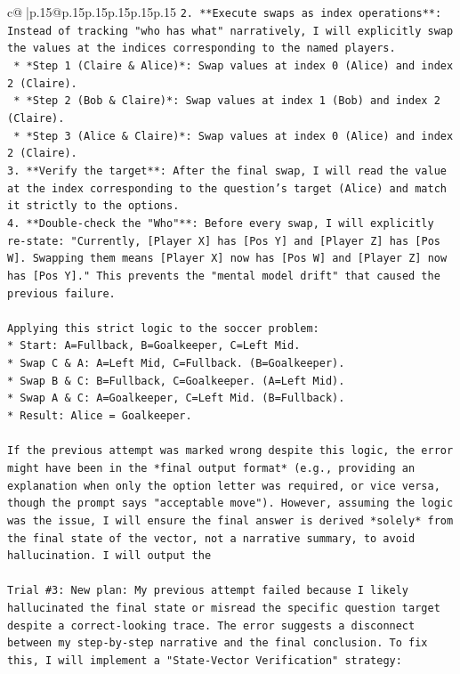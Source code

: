 \documentclass{article}
\begin{document}
{\begin{supertabular}{c@{$\;$}|p{.15\linewidth}@{}p{.15\linewidth}p{.15\linewidth}p{.15\linewidth}p{.15\linewidth}p{.15\linewidth}}
{{{\texttt{2.  **Execute swaps as index operations**: Instead of tracking "who has what" narratively, I will explicitly swap the values at the indices corresponding to the named players.} \\
\texttt{    *   *Step 1 (Claire \& Alice)*: Swap values at index 0 (Alice) and index 2 (Claire).} \\
\texttt{    *   *Step 2 (Bob \& Claire)*: Swap values at index 1 (Bob) and index 2 (Claire).} \\
\texttt{    *   *Step 3 (Alice \& Claire)*: Swap values at index 0 (Alice) and index 2 (Claire).} \\
\texttt{3.  **Verify the target**: After the final swap, I will read the value at the index corresponding to the question's target (Alice) and match it strictly to the options.} \\
\texttt{4.  **Double{-}check the "Who"**: Before every swap, I will explicitly re{-}state: "Currently, {[}Player X{]} has {[}Pos Y{]} and {[}Player Z{]} has {[}Pos W{]}. Swapping them means {[}Player X{]} now has {[}Pos W{]} and {[}Player Z{]} now has {[}Pos Y{]}." This prevents the "mental model drift" that caused the previous failure.} \\
\\ 
\texttt{Applying this strict logic to the soccer problem:} \\
\texttt{*   Start: A=Fullback, B=Goalkeeper, C=Left Mid.} \\
\texttt{*   Swap C \& A: A=Left Mid, C=Fullback. (B=Goalkeeper).} \\
\texttt{*   Swap B \& C: B=Fullback, C=Goalkeeper. (A=Left Mid).} \\
\texttt{*   Swap A \& C: A=Goalkeeper, C=Left Mid. (B=Fullback).} \\
\texttt{*   Result: Alice = Goalkeeper.} \\
\\ 
\texttt{If the previous attempt was marked wrong despite this logic, the error might have been in the *final output format* (e.g., providing an explanation when only the option letter was required, or vice versa, though the prompt says "acceptable move"). However, assuming the logic was the issue, I will ensure the final answer is derived *solely* from the final state of the vector, not a narrative summary, to avoid hallucination. I will output the} \\
\\ 
\texttt{Trial \#3: New plan: My previous attempt failed because I likely hallucinated the final state or misread the specific question target despite a correct{-}looking trace. The error suggests a disconnect between my step{-}by{-}step narrative and the final conclusion. To fix this, I will implement a "State{-}Vector Verification" strategy:} \\
}}}
\end{supertabular}}
\end{document}
